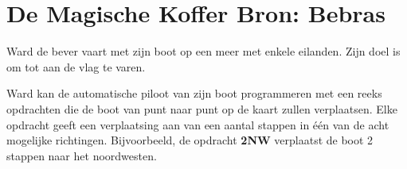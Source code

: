 \documentclass[12pt]{article}
\begin{document}
	\begin{minipage}{\textwidth}
		\section{De Magische Koffer \hfill\small Bron: Bebras}
			
			Ward de bever vaart met zijn boot op een meer met enkele eilanden. Zijn doel is om tot aan de vlag te varen.
			
			Ward kan de automatische piloot van zijn boot programmeren met een reeks opdrachten die de boot van punt naar punt op de kaart zullen verplaatsen. Elke opdracht geeft een verplaatsing aan van een aantal stappen in één van de acht mogelijke richtingen. Bijvoorbeeld, de opdracht \textbf{2NW} verplaatst de boot 2 stappen naar het noordwesten.
			

\end{minipage}
\end{document}

